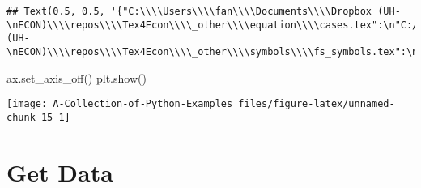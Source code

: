 \documentclass[
]{book}
\newenvironment{Shaded}{\begin{snugshade}}{\end{snugshade}}
\newcommand{\NormalTok}[1]{#1}
\begin{document}
\begin{verbatim}
## Text(0.5, 0.5, '{"C:\\\\Users\\\\fan\\\\Documents\\\\Dropbox (UH-\nECON)\\\\repos\\\\Tex4Econ\\\\_other\\\\equation\\\\cases.tex":\n"C:/Users/fan/Documents/cases.pdf",\n"C:\\\\Users\\\\fan\\\\Documents\\\\Dropbox (UH-\nECON)\\\\repos\\\\Tex4Econ\\\\_other\\\\symbols\\\\fs_symbols.tex":\n"C:/Users/fan/Documents/fs_symbols.pdf"}')
\end{verbatim}

\begin{Shaded}
\begin{Highlighting}[]
\NormalTok{ax.set\_axis\_off()}
\NormalTok{plt.show()}
\end{Highlighting}
\end{Shaded}

\begin{center}\texttt{[image: A-Collection-of-Python-Examples\_files/figure-latex/unnamed-chunk-15-1]} \end{center}

\hypertarget{get-data}{%
\chapter{Get Data}\label{get-data}}
\end{document}
